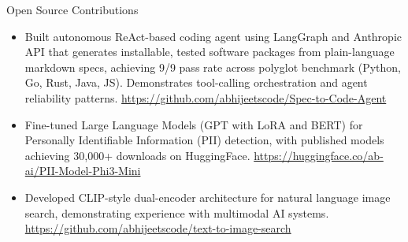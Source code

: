 \documentclass{resume} %
\begin{document}
\begin{rSection}{Open Source Contributions}
\begin{itemize}
    \item Built autonomous ReAct-based coding agent using LangGraph and Anthropic API that generates installable, tested software packages from plain-language markdown specs, achieving 9/9 pass rate across polyglot benchmark (Python, Go, Rust, Java, JS). Demonstrates tool-calling orchestration and agent reliability patterns. \url{https://github.com/abhijeetscode/Spec-to-Code-Agent}
    \item Fine-tuned Large Language Models (GPT with LoRA and BERT) for Personally Identifiable Information (PII) detection, with published models achieving 30,000+ downloads on HuggingFace. \url{https://huggingface.co/ab-ai/PII-Model-Phi3-Mini}
    \item Developed CLIP-style dual-encoder architecture for natural language image search, demonstrating experience with multimodal AI systems. \url{https://github.com/abhijeetscode/text-to-image-search}

\end{itemize}
\end{rSection}
\end{document}
